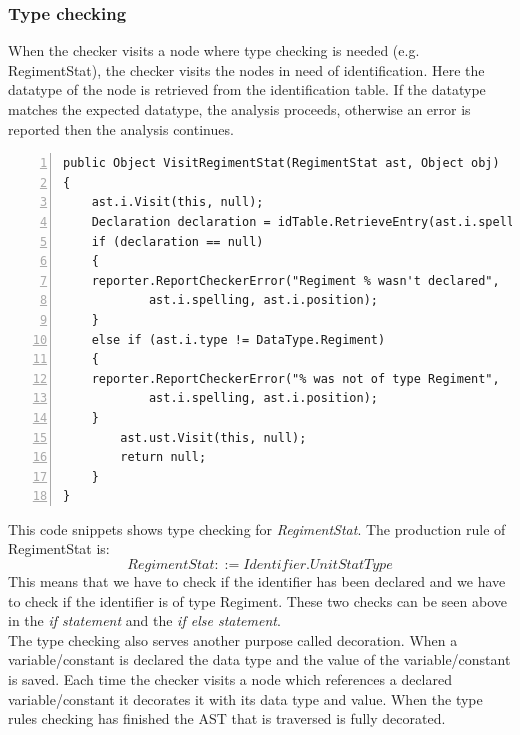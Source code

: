 		\subsubsection{Type checking}			
			When the checker visits a node where type checking is needed (e.g. RegimentStat), the checker visits the nodes 
			in need of identification. Here the datatype of the node is retrieved from the identification table. If the datatype matches the expected datatype, the analysis proceeds, otherwise an error is reported then the analysis continues. \\
\begin{lstlisting}[basicstyle=\small\sffamily,
					keywords={break,case,const,continue,default,else,enum,
					for,if,return,switch,while,do,long,void,int,float,double,
					char,struct,typedef,include,size\_t},
					keywordstyle={\color{blue}},
					comment={[l]{//}}, morecomment={[s]{/*}{*/}}, commentstyle=\itshape,
					columns={[l]flexible}, numbers=left, numberstyle=\tiny,
					frameround=fftt, frame=shadowbox, captionpos=b,
					caption={Type checking of RegimentStat},
					label=impl:typecheck]	
public Object VisitRegimentStat(RegimentStat ast, Object obj)
{
	ast.i.Visit(this, null);
	Declaration declaration = idTable.RetrieveEntry(ast.i.spelling);
	if (declaration == null)
	{
	reporter.ReportCheckerError("Regiment % wasn't declared", 
			ast.i.spelling, ast.i.position);
	}
	else if (ast.i.type != DataType.Regiment)
	{
	reporter.ReportCheckerError("% was not of type Regiment", 
			ast.i.spelling, ast.i.position);
	}
		ast.ust.Visit(this, null);
		return null;
    }
}
\end{lstlisting}
			This code snippets shows type checking for {\it RegimentStat}. 
			The production rule of RegimentStat is:
			\begin{equation}
				RegimentStat ::= Identifier.UnitStatType
			\end{equation} 
			This means that we have to check if the identifier has been declared and we have to check if the identifier is of type Regiment.
			These two checks can be seen above in the {\it if statement} and the {\it if else statement}. \\
			
			The type checking also serves another purpose called decoration. When a variable/constant is declared the data type 
			and the value of the variable/constant is saved. Each time the checker visits a node which references a declared 
			variable/constant it decorates it with its data type and value.
			When the type rules checking has finished the AST that is traversed is fully decorated.
			
			
		